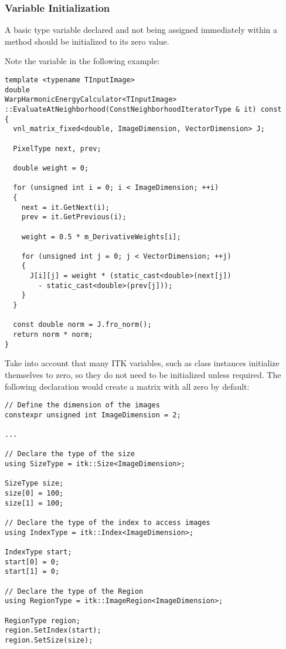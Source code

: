 \subsubsection{Variable Initialization}
\label{subsubsec:VariableInitialization}

A basic type variable declared and not being assigned immediately within a
method should be initialized to its zero value.

Note the  variable in the following example:

\small
\begin{verbatim}
template <typename TInputImage>
double
WarpHarmonicEnergyCalculator<TInputImage>
::EvaluateAtNeighborhood(ConstNeighborhoodIteratorType & it) const
{
  vnl_matrix_fixed<double, ImageDimension, VectorDimension> J;

  PixelType next, prev;

  double weight = 0;

  for (unsigned int i = 0; i < ImageDimension; ++i)
  {
    next = it.GetNext(i);
    prev = it.GetPrevious(i);

    weight = 0.5 * m_DerivativeWeights[i];

    for (unsigned int j = 0; j < VectorDimension; ++j)
    {
      J[i][j] = weight * (static_cast<double>(next[j])
        - static_cast<double>(prev[j]));
    }
  }

  const double norm = J.fro_norm();
  return norm * norm;
}
\end{verbatim}
\normalsize

Take into account that many ITK variables, such as  class
instances initialize themselves to zero, so they do not need to be initialized
unless required. The following declaration would create a matrix with all zero
by default:

\small
\begin{verbatim}
// Define the dimension of the images
constexpr unsigned int ImageDimension = 2;

...

// Declare the type of the size
using SizeType = itk::Size<ImageDimension>;

SizeType size;
size[0] = 100;
size[1] = 100;

// Declare the type of the index to access images
using IndexType = itk::Index<ImageDimension>;

IndexType start;
start[0] = 0;
start[1] = 0;

// Declare the type of the Region
using RegionType = itk::ImageRegion<ImageDimension>;

RegionType region;
region.SetIndex(start);
region.SetSize(size);
\end{verbatim}
\normalsize


